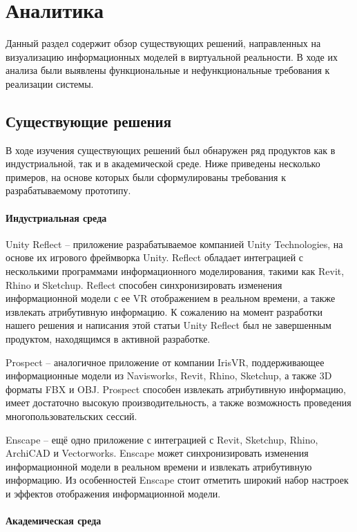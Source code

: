 ﻿\section{Аналитика}

Данный раздел содержит обзор существующих решений,
направленных на визуализацию информационных моделей в виртуальной реальности.
В ходе их анализа были выявлены функциональные и нефункциональные требования
к реализации системы. 

\subsection{Существующие решения}
В ходе изучения существующих решений был обнаружен ряд продуктов
как в индустриальной, так и в академической среде.
Ниже приведены несколько примеров,
на основе которых были сформулированы требования к разрабатываемому прототипу.

\paragraph{Индустриальная среда}

Unity Reflect -- приложение разрабатываемое компанией Unity Technologies,
на основе их игрового фреймворка Unity.
Reflect обладает интеграцией с несколькими программами информационного моделирования,
такими как Revit, Rhino и Sketchup.
Reflect способен синхронизировать изменения информационной модели с
ее VR отображением в реальном времени, а также извлекать атрибутивную информацию.
К сожалению на момент разработки нашего решения и написания этой статьи
Unity Reflect был не завершенным продуктом, находящимся в активной разработке.
\cite{UnityReflect}

Prospect -- аналогичное приложение от компании IrisVR,
поддерживающее информационные модели
из Navisworks, Revit, Rhino, Sketchup, а также 3D форматы FBX и OBJ.
Prospect способен извлекать атрибутивную информацию,
имеет достаточно высокую производительность,
а также возможность проведения многопользовательских сессий.
\cite{IrisVR}

Enscape -- ещё одно приложение с интеграцией
с Revit, Sketchup, Rhino, ArchiCAD и Vectorworks.
Enscape может синхронизировать изменения информационной модели в реальном времени
и извлекать атрибутивную информацию.
Из особенностей Enscape стоит отметить широкий набор
настроек и эффектов отображения информационной модели.
\cite{Enscape}

\paragraph{Академическая среда}

